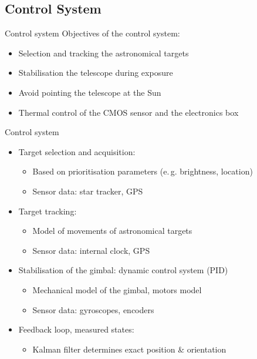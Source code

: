 \documentclass[11pt, aspectratio=169]{beamer}
\begin{document}
\subsection{Control System}

\begin{frame}{Control system}
    Objectives of the control system:
    \begin{itemize}
        \item Selection and tracking the astronomical targets
        \item Stabilisation the telescope during exposure
        \item Avoid pointing the telescope at the Sun
        \item Thermal control of the CMOS sensor and the electronics box
    \end{itemize}
\end{frame}

\begin{frame}{Control system}
    \begin{itemize}
        \item<1-> Target selection and acquisition: %
        \begin{itemize}
            \item Based on prioritisation parameters (e.\,g. brightness, location)
            \item Sensor data: star tracker, GPS %
        \end{itemize}
        \item<2-> Target tracking: 
        \begin{itemize}
            \item Model of movements of astronomical targets
            \item Sensor data: internal clock, GPS
        \end{itemize}
        \item<3-> Stabilisation of the gimbal: dynamic control system (PID) %
        \begin{itemize}
            \item Mechanical model of the gimbal, motors model
            \item Sensor data: gyroscopes, encoders%
        \end{itemize}
        \item<4-> Feedback loop, measured states: 
        \begin{itemize}
            \item Kalman filter determines exact position \& orientation
        \end{itemize}
    \end{itemize}
\end{frame}
\end{document}
